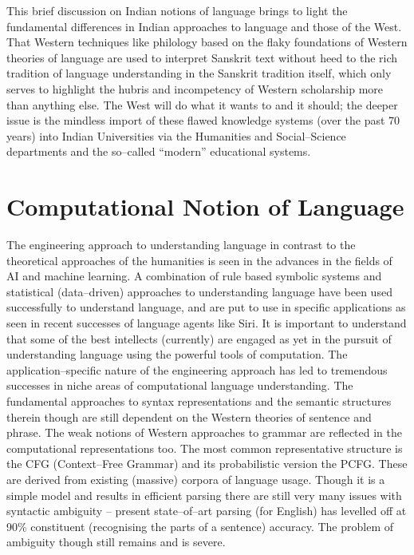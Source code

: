 This brief discussion on Indian notions of language brings to light the fundamental differences in Indian approaches to language and those of the West. That Western techniques like philology based on the flaky foundations of Western theories of language are used to interpret Sanskrit text without heed to the rich tradition of language understanding in the Sanskrit tradition itself, which only serves to highlight the hubris and incompetency of Western scholarship more than anything else. The West will do what it wants to and it should; the deeper issue is the mindless import of these flawed knowledge systems (over the past 70 years) into Indian Universities via the Humanities and Social–Science departments and the so–called “modern” educational systems.


\section*{Computational Notion of Language}

\vskip -6pt

The engineering approach to understanding language in contrast to the theoretical approaches of the humanities is seen in the advances in the fields of AI and machine learning. A combination of rule based symbolic systems and statistical (data–driven) approaches to understanding language have been used successfully to understand language, and are put to use in specific applications as seen in recent successes of language agents like Siri. It is important to understand that some of the best intellects (currently) are engaged as yet in the pursuit of understanding language using the powerful tools of computation. The application–specific nature of the engineering approach has led to tremendous successes in niche areas of computational language understanding. The fundamental approaches to syntax representations and the semantic structures therein though are still dependent on the Western theories of sentence and phrase. The weak notions of Western approaches to grammar are reflected in the computational representations too. The most common representative structure is the CFG (Context–Free Grammar) and its probabilistic version the PCFG. These are derived from existing (massive) corpora of language usage. Though it is a simple model and results in efficient parsing there are still very many issues with syntactic ambiguity – present state–of–art parsing (for English) has levelled off at 90\% constituent (recognising the parts of a sentence) accuracy. The problem of ambiguity though still remains and is severe.

